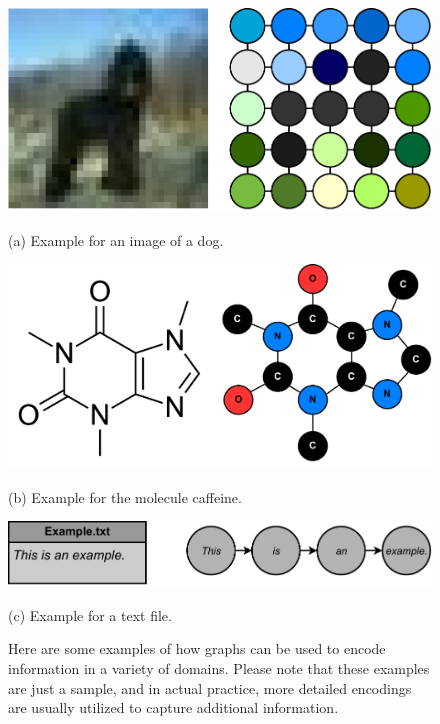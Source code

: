 \begin{figure}
    \centering
    \begin{minipage}[b]{0.475\textwidth}
        \centering
        \includegraphics[width=\textwidth]{Figures/Example_Encoding_Image.pdf}
        \caption*{(a) Example for an image of a dog.\footnotemark}
    \end{minipage}
    \hfill
    \begin{minipage}[b]{0.475\textwidth}
        \centering
        \includegraphics[width=\textwidth]{Figures/Example_Encoding_Molecule.pdf}
        \caption*{(b) Example for the molecule caffeine.\footnotemark}
    \end{minipage}
    \par\medskip
    \vspace{0.75cm}
    \centering
    \includegraphics[scale=.5]{Figures/Example_Encoding_Text.pdf}
    \caption*{(c) Example for a text file.}
    \hfill

    \caption[Caption for LOF]{Here are some examples of how graphs can be used to encode information in a variety of domains. Please note that these examples are just a sample, and in actual practice, more detailed encodings are usually utilized to capture additional information.\footnotemark}
    \label{fig:example_encodings}
\end{figure}


